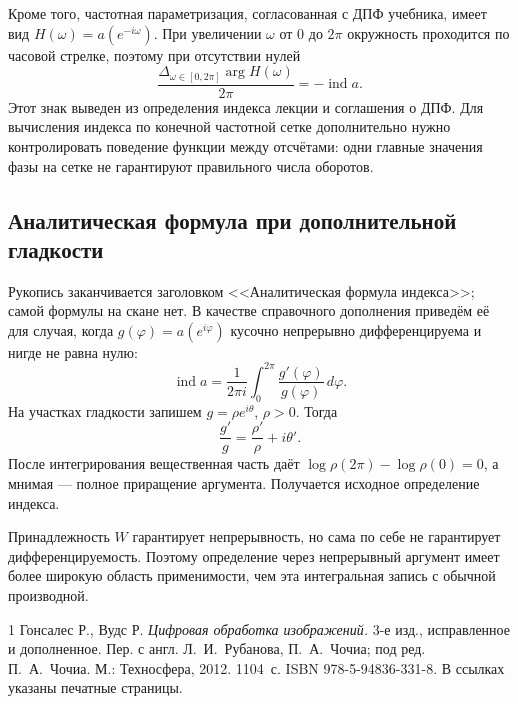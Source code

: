 \documentclass[12pt,a4paper]{article}
\theoremstyle{definition}
\theoremstyle{remark}
\DeclareMathOperator{\ind}{ind}
\begin{document}
Кроме того, частотная параметризация, согласованная с ДПФ учебника,
имеет вид $H(\omega)=a(e^{-i\omega})$.
При увеличении $\omega$ от $0$ до $2\pi$ окружность проходится
по часовой стрелке, поэтому при отсутствии нулей
\[
  \frac{\Delta_{\omega\in[0,2\pi]}\arg H(\omega)}{2\pi}
  =-\ind a.
\]
Этот знак выведен из определения индекса лекции и соглашения о ДПФ.
Для вычисления индекса по конечной частотной сетке дополнительно
нужно контролировать поведение функции между отсчётами:
одни главные значения фазы на сетке не гарантируют правильного
числа оборотов.

\subsection{Аналитическая формула при дополнительной гладкости}

Рукопись заканчивается заголовком <<Аналитическая формула индекса>>;
самой формулы на скане нет. В качестве справочного дополнения приведём
её для случая, когда $g(\varphi)=a(e^{i\varphi})$ кусочно непрерывно
дифференцируема и нигде не равна нулю:
\[
  \boxed{\ind a=\frac1{2\pi i}\int_0^{2\pi}
    \frac{g'(\varphi)}{g(\varphi)}\,d\varphi}.
\]
На участках гладкости запишем $g=\rho e^{i\theta}$, $\rho>0$. Тогда
\[
  \frac{g'}g=\frac{\rho'}\rho+i\theta'.
\]
После интегрирования вещественная часть даёт
$\log\rho(2\pi)-\log\rho(0)=0$, а мнимая --- полное приращение
аргумента. Получается исходное определение индекса.

Принадлежность $W$ гарантирует непрерывность, но сама по себе не
гарантирует дифференцируемость. Поэтому определение через непрерывный
аргумент имеет более широкую область применимости, чем эта интегральная
запись с обычной производной.

\begingroup
\small
\begin{thebibliography}{1}
Гонсалес Р., Вудс Р.
\emph{Цифровая обработка изображений.}
3-е изд., исправленное и дополненное.
Пер. с англ. Л.~И.~Рубанова, П.~А.~Чочиа;
под ред. П.~А.~Чочиа. М.: Техносфера, 2012. 1104~с.
ISBN 978-5-94836-331-8.
В ссылках указаны печатные страницы.
\end{thebibliography}
\endgroup
\end{document}
